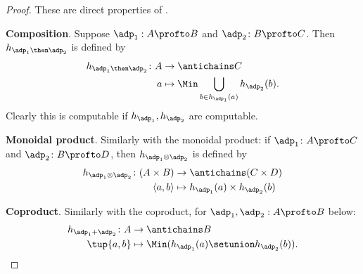 \begin{proof}
    These are direct properties of \DP.


    \textbf{Composition}.
    Suppose $\adp_1 : A \profto B$ and $\adp_2 \colon B \profto C$.
    Then $h_{\adp_1\then \adp_2} $ is defined by
    \begin{equation}
        \begin{aligned}
            h_{\adp_1 \then \adp_2} \colon A & \to \antichains C                                         \\
            a                                & \mapsto \Min \bigcup_{b \in h_{\adp_1}(a)} h_{\adp_2}(b).
        \end{aligned}
    \end{equation}
    Clearly this is computable if $h_{\adp_1}, h_{\adp_2}$ are computable.


    \textbf{Monoidal product}.
    Similarly with the monoidal product: if $\adp_1 \colon A \profto C$ and $\adp_2 \colon B \profto D$, then $h_{\adp_1 \otimes \adp_2}$ is defined by
    \begin{equation}
        \begin{aligned}
            h_{\adp_1 \otimes \adp_2} \colon (A \times B) & \to \antichains (C \times D)               \\
            \langle a, b \rangle                          & \mapsto h_{\adp_1}(a) \times h_{\adp_2}(b)
        \end{aligned}
    \end{equation}

    \textbf{Coproduct}.
    Similarly with the coproduct, for $\adp_1, \adp_2 : A \profto B$ below:
    \begin{equation}
        \begin{aligned}
            h_{\adp_1 + \adp_2} \colon  A & \to \antichains B                                     \\
            \tup{a,b}                     & \mapsto \Min (h_{\adp_1}(a) \setunion h_{\adp_2}(b)).
        \end{aligned}
    \end{equation}

\end{proof}


